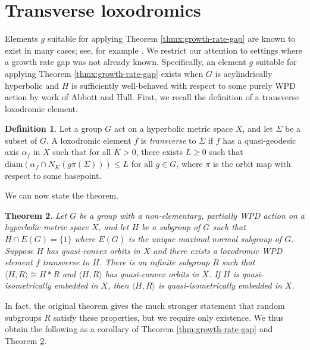 \documentclass[11pt,letterpaper]{amsart}
\newtheorem{theorem}{Theorem}[section]
\theoremstyle{definition}
\newtheorem{definition}[theorem]{Definition}
\theoremstyle{plain}
\theoremstyle{TheoremNum}
\begin{document}
\section{Transverse loxodromics}
Elements $g$ suitable for applying Theorem \ref{thmx:growth-rate-gap} are known to exist in many cases; see, for example \cite{Abbott-Dahmani,reducibles-in-CAL,Arzhantseva-qconvex-hyperbolic,cstar-simple-rel-hyp,Gitik-ping-pong,Gromov-hyp-groups,Legaspi-path-system-growth,RST}. We restrict our attention to settings where a growth rate gap was not already known. Specifically, an element $g$ suitable for applying Theorem \ref{thmx:growth-rate-gap} exists when $G$ is acylindrically hyperbolic and $H$ is sufficiently well-behaved with respect to some purely WPD action by work of Abbott and Hull. First, we recall the definition of a transverse loxodromic element.
\begin{definition}
    Let a group $G$ act on a hyperbolic metric space $X$, and let $\Sigma$ be a subset of $G$. A loxodromic element $f$ is \emph{transverse} to $\Sigma$ if $f$ has a quasi-geodesic axis $\alpha_f$ in $X$ such that for all $K > 0$, there exists $L \geq 0$ such that $\text{diam}(\alpha_f \cap N_K(g \pi(\Sigma))) \leq L$ for all $g \in G$, where $\pi$ is the orbit map with respect to some basepoint.
\end{definition}
We can now state the theorem.
\begin{theorem}\cite[Special case of Theorem~1.1]{Abbott-Hull}\label{thm:abbott-hull-1.1}
    Let $G$ be a group with a non-elementary, partially WPD action on a hyperbolic metric space $X$, and let $H$ be a subgroup of $G$ such that $H \cap E(G) = \{1\}$ where $E(G)$ is the unique maximal normal subgroup of $G$. Suppose $H$ has quasi-convex orbits in $X$ and there exists a loxodromic WPD element $f$ transverse to $H$. There is an infinite subgroup $R$ such that $\langle H , R \rangle \cong H * R$ and $\langle H, R \rangle$ has quasi-convex orbits in $X$. If $H$ is quasi-isometrically embedded in $X$, then $\langle H , R \rangle $ is quasi-isometrically embedded in $X$.
\end{theorem}
In fact, the original theorem gives the much stronger statement that random subgroups $R$ satisfy these properties, but we require only existence. We thus obtain the following as a corollary of Theorem \ref{thm:growth-rate-gap} and Theorem \ref{thm:abbott-hull-1.1}.
\end{document}
